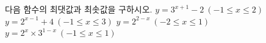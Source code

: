 다음 함수의 최댓값과 최솟값을 구하시오.
 $y=3^{x+1}-2\ (-1\le x\le 2)$
 $y=2^{x-1}+4\ (-1\le x\le 3)$
 $y=2^{2-x}\ (-2\le x\le 1)$
 $y=2^x\times 3^{1-x}\ (-1\le x\le 1)$
